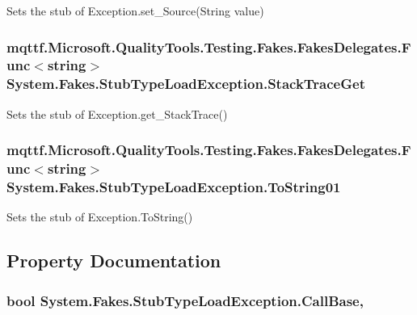 Sets the stub of Exception.\-set\-\_\-\-Source(\-String value)

\hypertarget{class_system_1_1_fakes_1_1_stub_type_load_exception_a4b300ab89b63ccc67df0dec2616d2d9f}{
\subsubsection[{Stack\-Trace\-Get}]{\setlength{\rightskip}{0pt plus 5cm}mqttf.\-Microsoft.\-Quality\-Tools.\-Testing.\-Fakes.\-Fakes\-Delegates.\-Func$<$string$>$ System.\-Fakes.\-Stub\-Type\-Load\-Exception.\-Stack\-Trace\-Get}}\label{class_system_1_1_fakes_1_1_stub_type_load_exception_a4b300ab89b63ccc67df0dec2616d2d9f}


Sets the stub of Exception.\-get\-\_\-\-Stack\-Trace()

\hypertarget{class_system_1_1_fakes_1_1_stub_type_load_exception_a2d7fe1eaa4d1f5f6b5a9c28d47cae9fa}{
\subsubsection[{To\-String01}]{\setlength{\rightskip}{0pt plus 5cm}mqttf.\-Microsoft.\-Quality\-Tools.\-Testing.\-Fakes.\-Fakes\-Delegates.\-Func$<$string$>$ System.\-Fakes.\-Stub\-Type\-Load\-Exception.\-To\-String01}}\label{class_system_1_1_fakes_1_1_stub_type_load_exception_a2d7fe1eaa4d1f5f6b5a9c28d47cae9fa}


Sets the stub of Exception.\-To\-String()



\subsection{Property Documentation}
\hypertarget{class_system_1_1_fakes_1_1_stub_type_load_exception_a0ba251684339805130d436c1f848f0be}{
\subsubsection[{Call\-Base}]{\setlength{\rightskip}{0pt plus 5cm}bool System.\-Fakes.\-Stub\-Type\-Load\-Exception.\-Call\-Base\hspace{0.3cm}{\ttfamily [get]}, {\ttfamily [set]}}}\label{class_system_1_1_fakes_1_1_stub_type_load_exception_a0ba251684339805130d436c1f848f0be}


